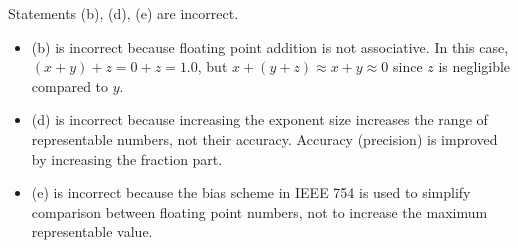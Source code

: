 \documentclass[12pt]{article}
\begin{document}
Statements (b), (d), (e) are incorrect.

\begin{itemize}
    \item (b) is incorrect because floating point addition is not associative. In this case, $(x+y)+z = 0+z = 1.0$, but $x+(y+z) \approx x+y \approx 0$ since $z$ is negligible compared to $y$.
    \item (d) is incorrect because increasing the exponent size increases the range of representable numbers, not their accuracy. Accuracy (precision) is improved by increasing the fraction part.
    \item (e) is incorrect because the bias scheme in IEEE 754 is used to simplify comparison between floating point numbers, not to increase the maximum representable value.
\end{itemize}
\end{document}
